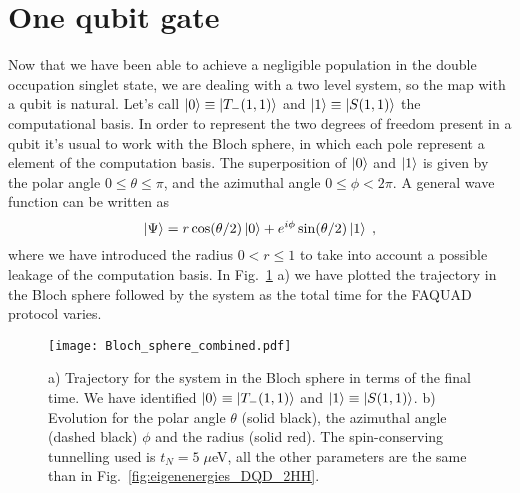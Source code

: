 \section{One qubit gate}
Now that we have been able to achieve a negligible population in the double occupation singlet state, we are dealing with a two level system, so the map with a qubit is natural. Let's call $\ket{0}\equiv\ket{T_-(1,1)}$ and $\ket{1}\equiv \ket{S(1,1)}$ the computational basis. In order to represent the two degrees of freedom present in a qubit it's usual to work with the Bloch sphere, in which each pole represent a element of the computation basis. The superposition of $\ket{0}$ and $\ket{1}$ is given by the polar angle $0\leq \theta\leq \pi$, and the azimuthal angle $0\leq\phi<2\pi$. A general wave function can be written as
\begin{equation}
	\ket{\Psi}=r\cos(\theta/2)\ket{0}+e^{i\phi}\sin(\theta/2)\ket{1}\; ,
\end{equation}
where we have introduced the radius $0<r\leq 1$ to take into account a possible leakage of the computation basis. In Fig.~\ref{fig:Bloch_sphere_combined} a) we have plotted the trajectory in the Bloch sphere followed by the system as the total time for the FAQUAD protocol varies.
\begin{figure}[!htb]
	\centering
	\texttt{[image: Bloch\_sphere\_combined.pdf]}
	\caption{a) Trajectory for the system in the Bloch sphere in terms of the final time. We have identified $\ket{0}\equiv\ket{T_-(1,1)}$ and $\ket{1}\equiv \ket{S(1,1)}$. b) Evolution for the polar angle $\theta$ (solid black), the azimuthal angle (dashed black) $\phi$ and the radius (solid red). The spin-conserving tunnelling used is $t_N=5\; \mu$eV, all the other parameters are the same than in Fig.~\ref{fig:eigenenergies_DQD_2HH}.}
	\label{fig:Bloch_sphere_combined}
\end{figure}

